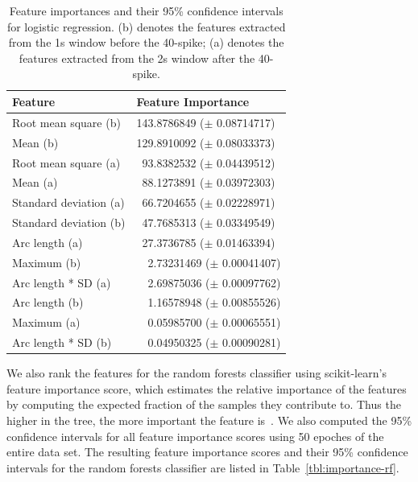 \begin{table}[t]
\centering
\caption{Feature importances and their 95\% confidence intervals for logistic regression. (b) denotes the features extracted from the 1s window before the 40-spike; (a) denotes the features extracted from the 2s window after the 40-spike.}
\begin{tabular}{@{}ll@{}}
\toprule
Feature                & Feature Importance \\ \midrule
Root mean square (b)   &   143.8786849  ($\pm$ 0.08714717)       \\
Mean (b)               &   129.8910092 ($\pm$ 0.08033373)       \\
Root mean square (a)   &  \ 93.8382532  ($\pm$ 0.04439512)       \\
Mean (a)               &  \ 88.1273891  ($\pm$ 0.03972303)       \\
Standard deviation (a) &  \ 66.7204655  ($\pm$ 0.02228971)       \\
Standard deviation (b) &  \ 47.7685313  ($\pm$ 0.03349549)       \\
Arc length (a)         &  \ 27.3736785  ($\pm$ 0.01463394)       \\
Maximum (b)            & \ \ 2.73231469 ($\pm$ 0.00041407)       \\
Arc length * SD (a)    & \ \ 2.69875036 ($\pm$ 0.00097762)       \\
Arc length (b)         & \ \ 1.16578948 ($\pm$ 0.00855526)       \\
Maximum (a)            & \ \ 0.05985700 ($\pm$ 0.00065551)       \\
Arc length * SD (b)    & \ \ 0.04950325 ($\pm$ 0.00090281)       \\ \bottomrule

\end{tabular}
\label{tbl:importance-lr}
\end{table}

We also rank the features for the random forests classifier using scikit-learn's feature importance score, which estimates the relative importance of the features by computing the expected fraction of the samples they contribute to.
Thus the higher in the tree, the more important the feature is~\cite{sklearn:rfdoc}.
We also computed the 95\% confidence intervals for all feature importance scores using 50 epoches of the entire data set.
The resulting feature importance scores and their 95\% confidence intervals for the random forests classifier are listed in Table~\ref{tbl:importance-rf}.

